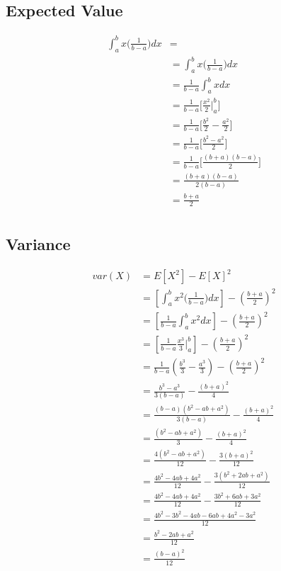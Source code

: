\documentclass[]{book}
\begin{document}
\subsection{Expected Value}
\begin{align*}
\int_{a}^{b} {x\big( \frac{1}{b-a} \big)dx} &= \\
&= \int_{a}^{b} {x\big( \frac{1}{b-a} \big)dx}\\
&= \frac{1}{b-a}\int_{a}^{b} {xdx}\\
&= \frac{1}{b-a}\big[ \frac{x^2}{2}|_{a}^{b} \big]\\
&= \frac{1}{b-a}\big[ \frac{b^2}{2} - \frac{a^2}{2} \big]\\
&= \frac{1}{b-a}\big[ \frac{b^2-a^2}{2} \big]\\
&= \frac{1}{b-a}\big[ \frac{(b+a)(b-a)}{2} \big]\\
&= \frac{(b+a)(b-a)}{2(b-a)}\\
&= \frac{b+a}{2}\\
\end{align*}

\subsection{Variance}
\begin{align*}
var(X) &= E[X^2] - E[X]^2\\
&= [\int_{a}^{b} {x^2\big( \frac{1}{b-a} \big)dx}] - (\frac{b+a}{2})^2\\
&= [\frac{1}{b-a}\int_{a}^{b} {x^2dx}] - (\frac{b+a}{2})^2\\
&= [\frac{1}{b-a}\frac{x^3}{3}|_{a}^{b}] - (\frac{b+a}{2})^2\\
&= \frac{1}{b-a}(\frac{b^3}{3}-\frac{a^3}{3}) - (\frac{b+a}{2})^2\\
&= \frac{b^3-a^3}{3(b-a)} - \frac{(b+a)^2}{4}\\
&= \frac{(b-a)(b^2-ab+a^2)}{3(b-a)} - \frac{(b+a)^2}{4}\\
&= \frac{(b^2-ab+a^2)}{3} - \frac{(b+a)^2}{4}\\
&= \frac{4(b^2-ab+a^2)}{12} - \frac{3(b+a)^2}{12}\\
&= \frac{4b^2-4ab+4a^2}{12} - \frac{3(b^2+2ab+a^2)}{12}\\
&= \frac{4b^2-4ab+4a^2}{12} - \frac{3b^2+6ab+3a^2}{12}\\
&= \frac{4b^2-3b^2-4ab-6ab+4a^2-3a^2}{12}\\
&= \frac{b^2-2ab+a^2}{12}\\
&= \frac{(b-a)^2}{12}\\
\end{align*}
\end{document}
